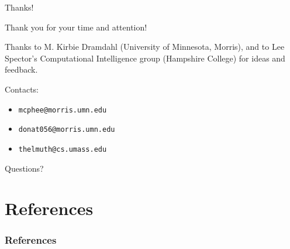\documentclass{beamer}
\newcommand{\linespace}{\vskip 0.25cm}
\begin{document}
\begin{frame}{Thanks!}
	
	Thank you for your time and attention!

	\linespace
	
	Thanks to M. Kirbie Dramdahl (University of Minnesota, Morris), and to Lee Spector's Computational Intelligence group (Hampshire College) for ideas and feedback.
	
	\linespace
	
	Contacts:  
	\begin{itemize}
		\item \texttt{mcphee@morris.umn.edu}
		\item \texttt{donat056@morris.umn.edu}
		\item \texttt{thelmuth@cs.umass.edu}
	\end{itemize}
	
	\linespace
	\linespace
	
	\begin{center}
	{\huge Questions?}
	\end{center}
\end{frame}

\section*{References}

\begin{frame} 
\frametitle{References}

{\tiny }
\end{frame} 
\end{document}
